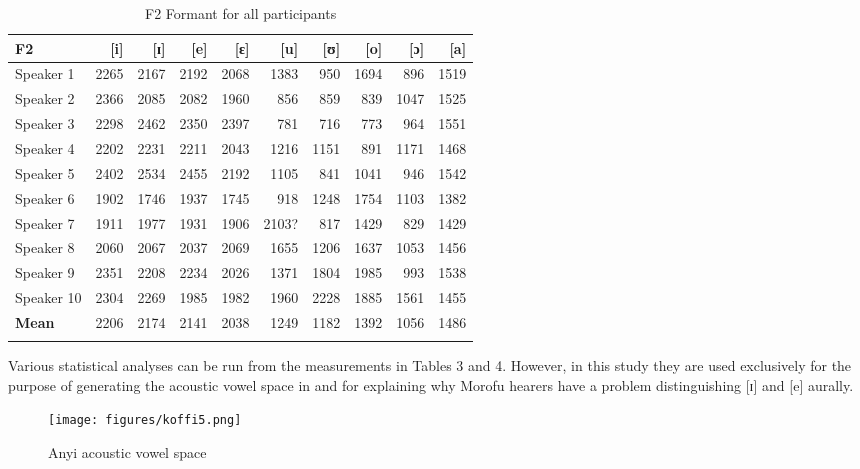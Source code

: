\documentclass[output=paper,
modfonts
]{langscibook}
\begin{document}
\begin{table}[p]
\caption{F2 Formant for all participants} 
\begin{tabularx}{\textwidth}{Xrrrrrrrrr}
\lsptoprule
 {\textbf{F2}} &  {[i]} &  {[ɪ]} &  {[e]} &  {[ɛ]} &  {[u]} &  {[ʊ]} &  {[o]} &  {[ɔ]} &  {[a]}\\
\midrule
 {Speaker 1} &  {2265} &  {2167} &  {2192} &  {2068} &  {1383} &  {950} &  {1694}  &  {896} &  {1519} \\
 {Speaker 2} &  {2366} &  {2085} &  {2082} &  {1960} &  {856} &  {859} &  {839} &  {1047} &  {1525}\\
 {Speaker 3} &  {2298} &  {2462} &  {2350} &  {2397} &  {781} &  {716} &  {773} &  {964} &  {1551}\\
 {Speaker 4} &  {2202} &  {2231} &  {2211} &  {2043} &  {1216} &  {1151} &  {891} &  {1171} &  {1468} \\
 {Speaker 5} &  {2402} &  {2534} &  {2455} &  {2192} &  {1105} &  {841} &  {1041} &  {946} &  {1542}\\
 {Speaker 6} &  {1902} &  {1746} &  {1937} &  {1745} &  {918} &  {1248} &  {1754} &  {1103} &  {1382}\\
 {Speaker 7} &  {1911} &  {1977} &  {1931} &  {1906} &  {2103?} &  {817} &  {1429} &  {829} &  {1429}\\
 {Speaker 8} &  {2060} &  {2067} &  {2037} &  {2069} &  {1655} &  {1206} &  {1637} &  {1053} &  {1456}\\
 {Speaker 9} &  {2351} &  {2208} &  {2234} &  {2026} &  {1371} &  {1804} &  {1985} &  {993} &  {1538}\\
 {Speaker 10} &  {2304} &  {2269} &  {1985} &  {1982} &  {1960} &  {2228} &  {1885} &  {1561} &  {1455}\\
\midrule 
 {\textbf{Mean}} &  {2206} &  {2174} &  {2141} &  {2038} &  {1249} &  {1182} &  {1392} &  {1056} &  {1486}\\
\lspbottomrule
\end{tabularx} 
\label{tab:koffi:4}
\end{table}

Various statistical analyses can be run from the measurements in Tables 3 and 4. However, in this study they are used exclusively for the purpose of generating the acoustic vowel space in  and for explaining why  Morofu hearers have a problem distinguishing [ɪ] and [e] aurally. 
  
 
\begin{figure}
\texttt{[image: figures/koffi5.png]}
\caption{Anyi acoustic vowel space}
\label{fig:koffi:5}
\end{figure}
\end{document}
